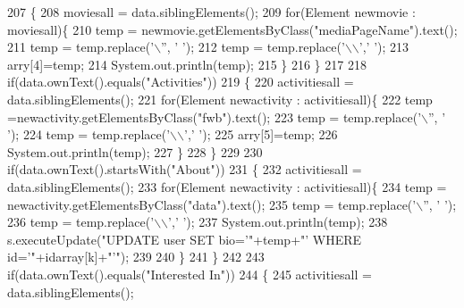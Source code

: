 \begin{DoxyCode}
207                 \{
208                     moviesall = data.siblingElements();
209                 \textcolor{keywordflow}{for}(Element newmovie : moviesall)\{
210                     temp = newmovie.getElementsByClass(\textcolor{stringliteral}{"mediaPageName"}).text();
211                     temp = temp.replace(\textcolor{charliteral}{'\(\backslash\)''}, \textcolor{charliteral}{' '});
212                     temp = temp.replace(\textcolor{charliteral}{'\(\backslash\)\(\backslash\)'},\textcolor{charliteral}{' '});
213                     arry[4]=temp;
214                     System.out.println(temp);
215                 \}
216                 \}
217                 
218                 \textcolor{keywordflow}{if}(data.ownText().equals(\textcolor{stringliteral}{"Activities"}))
219                 \{
220                     activitiesall = data.siblingElements();
221                 \textcolor{keywordflow}{for}(Element newactivity : activitiesall)\{
222                     temp =newactivity.getElementsByClass(\textcolor{stringliteral}{"fwb"}).text();
223                     temp = temp.replace(\textcolor{charliteral}{'\(\backslash\)''}, \textcolor{charliteral}{' '});
224                     temp = temp.replace(\textcolor{charliteral}{'\(\backslash\)\(\backslash\)'},\textcolor{charliteral}{' '});
225                     arry[5]=temp;
226                     System.out.println(temp);
227                 \}
228                 \}
229                 
230                 \textcolor{keywordflow}{if}(data.ownText().startsWith(\textcolor{stringliteral}{"About"}))
231                 \{
232                     activitiesall = data.siblingElements();
233                 \textcolor{keywordflow}{for}(Element newactivity : activitiesall)\{
234                     temp = newactivity.getElementsByClass(\textcolor{stringliteral}{"data"}).text();
235                     temp = temp.replace(\textcolor{charliteral}{'\(\backslash\)''}, \textcolor{charliteral}{' '});
236                     temp = temp.replace(\textcolor{charliteral}{'\(\backslash\)\(\backslash\)'},\textcolor{charliteral}{' '});
237                     System.out.println(temp);
238                     s.executeUpdate(\textcolor{stringliteral}{"UPDATE user SET bio='"}+temp+\textcolor{stringliteral}{"' WHERE id='"}+idarray[k]+\textcolor{stringliteral}{"'"});
239                     
240                 \}
241                 \}
242                 
243                 \textcolor{keywordflow}{if}(data.ownText().equals(\textcolor{stringliteral}{"Interested In"}))
244                 \{
245                     activitiesall = data.siblingElements();

\end{DoxyCode}

